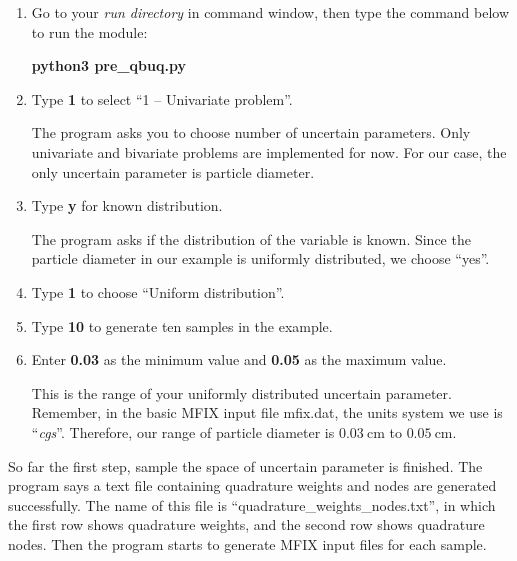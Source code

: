 \documentclass[a4paper,12pt,titlepage]{article}
\begin{document}
\begin{enumerate}[leftmargin=0cm,itemindent=0.5cm]
 \item Go to your \emph{run directory} in command window, then type the command 
  below to run the module:
  
  \textbf{python3 pre\_qbuq.py}
  
 \item Type \textbf{1} to select ``1 -- Univariate problem''.
 
 The program asks you to choose number of uncertain parameters. Only univariate 
 and bivariate problems are implemented for now. For our case, the only uncertain
 parameter is particle diameter.
 
 \item Type \textbf{y} for known distribution.
 
 The program asks if the distribution of the variable is known. Since the 
 particle diameter in our example is uniformly distributed, we choose ``yes''.
 
 \item Type \textbf{1} to choose ``Uniform distribution''.
 
 \item Type \textbf{10} to generate ten samples in the example.
 
 \item Enter \textbf{0.03} as the minimum value and \textbf{0.05} as the maximum
 value.
 
 This is the range of your uniformly distributed uncertain parameter. Remember, 
 in the basic MFIX input file mfix.dat, the units system we use is 
 ``\emph{cgs}''. Therefore, our range of particle diameter is 
 $0.03\ \textrm{cm}$ to $0.05\ \textrm{cm}$.
\end{enumerate}

So far the first step, sample the space of uncertain parameter is finished. The
program says a text file containing quadrature weights and nodes are generated 
successfully. The name of this file is ``quadrature\_weights\_nodes.txt'', in 
which the first row shows quadrature weights, and the second row shows 
quadrature nodes. Then the program starts to generate MFIX input files for each 
sample.
\end{document}
